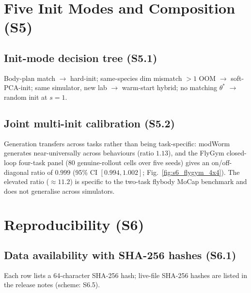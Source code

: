 \documentclass[11pt]{article}
\begin{document}
\section{Five Init Modes and Composition (S5)}
\label{si:init_modes}

\subsection{Init-mode decision tree (S5.1)}
Body-plan match $\to$ hard-init; same-species dim mismatch $>1$ OOM $\to$ soft-PCA-init; same simulator, new lab $\to$ warm-start hybrid; no matching $\theta^{*}$ $\to$ random init at $s{=}1$.

\subsection{Joint multi-init calibration (S5.2)}
Generation transfers across tasks rather than being task-specific: modWorm generates near-universally across behaviours (ratio $1.13$), and the FlyGym closed-loop four-task panel (80 genuine-rollout cells over five seeds) gives an on/off-diagonal ratio of $0.999$ (95\% CI $[0.994, 1.002]$; Fig.~\ref{fig:s6_flygym_4x4}). The elevated ratio ($\approx 11.2$) is specific to the two-task flybody MoCap benchmark and does not generalise across simulators.

\section{Reproducibility (S6)}
\label{si:repro}

\subsection{Data availability with SHA-256 hashes (S6.1)}

Each row lists a 64-character SHA-256 hash; live-file SHA-256 hashes are listed in the release notes (scheme: S6.5).
\end{document}
